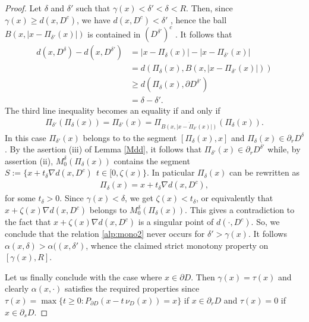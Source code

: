 \documentclass[reqno,11pt]{amsart}
\theoremstyle{definition}
\numberwithin{equation}{section}
\def\ov{\overline}
\newcommand{\1}{{{\bf 1}\kern-0,28em\rm l}}
\def\proj{\Pi}
\begin{document}
\begin{proof}
Let $\delta$ and $\delta'$ such that $\gamma(x) <\delta'< \delta<R$. Then, since $\gamma(x)\ge d(x,D^c)$, we have  $d(x,D^c)<\delta'$ , hence   the ball $B(x, |x- \proj_{\delta'}(x)|)$ is contained in $(D^{\delta'})^c$ . It follows that
\begin{align*}
d(x,D^\delta)- d(x, D^{\delta'}) 
&= |x- \proj_\delta (x)| -|x- \proj_{\delta'} (x)| \\
&= d ( \proj_\delta (x), B(x, |x- \proj_{\delta'} (x)|) ) \\
&\ge d( \proj_\delta (x), \partial D^{\delta'})\\
&= \delta- \delta'.
\end{align*}
The third line inequality  becomes an equality  if and only if
\begin{align}
\proj_{\delta'} (\proj_\delta (x)) = \proj_{\delta'} (x) = \proj_{\ov {B(x,|x- \proj_{\delta'} (x)|)} } (\proj_\delta (x))  .\label{alp:mono2}
\end{align}
In this case $\Pi_{\delta'}(x)$ belongs to to the segment  $[ \proj_\delta (x),x]$ and  $\proj_\delta (x)\in \partial_r D^\delta$. By the asertion (iii) of Lemma \ref{Mdd}, it follows that $\proj_{\delta'} (x)\in \partial_r D^{\delta'}$ while, by assertion (ii),  $M_0^\delta(\proj_\delta (x))$ contains  the segment
$S:= \{ x +t_\delta \nabla d(x,D^c)\:\ t\in [0, \zeta(x)\}$. In paticular $\proj_\delta (x)$ can be rewritten as
\begin{align*}
\proj_\delta (x) = x +t_\delta \nabla d(x,D^c),
\end{align*}
for some $t_\delta>0$. Since $\gamma(x) < \delta$, we get $\zeta(x) < t_{\delta}$, or equivalently that  $x+\zeta(x) \nabla d(x,D^c) $ belongs to $M_0^\delta(\proj_\delta (x))$. This gives a contradiction to the fact that $x+\zeta(x)  \nabla d(x,D^c) $ is a singular point of $d(\cdot,D^c)$. So, we conclude that the relation \eqref{alp:mono2} never occurs for $\delta'>\gamma(x)$. It follows  $\alpha(x,\delta)>\alpha((x,\delta')$, whence the claimed strict monotony
property on $[\gamma(x), R]$.

Let us finally conclude with the case where $x\in \partial D$. Then $\gamma(x)=\tau(x)$ and clearly $\alpha(x,\cdot)$ satisfies the required properties 
 since $\tau(x)= \max \{t\ge 0: P_{\partial D}(x- t \, \nu_D(x))=x\}$ if $x\in \partial_r D$ and $\tau(x)=0$ if $x\in \partial_s D$.


\end{proof}
\end{document}
